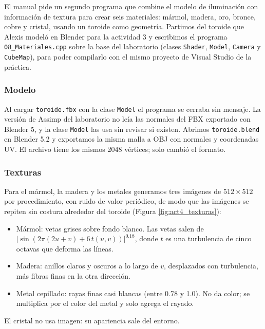 El manual pide un segundo programa que combine el modelo de iluminación con información de textura para crear seis materiales: mármol, madera, oro, bronce, cobre y cristal, usando un toroide como geometría. Partimos del toroide que Alexis modeló en Blender para la actividad 3 y escribimos el programa \texttt{08\_Materiales.cpp} sobre la base del laboratorio (clases \texttt{Shader}, \texttt{Model}, \texttt{Camera} y \texttt{CubeMap}), para poder compilarlo con el mismo proyecto de Visual Studio de la práctica.

\subsubsection{Modelo}

Al cargar \texttt{toroide.fbx} con la clase \texttt{Model} el programa se cerraba sin mensaje. La versión de Assimp del laboratorio no leía las normales del FBX exportado con Blender 5, y la clase \texttt{Model} las usa sin revisar si existen. Abrimos \texttt{toroide.blend} en Blender 5.2 y exportamos la misma malla a OBJ con normales y coordenadas UV. El archivo tiene los mismos 2048 vértices; solo cambió el formato.

\subsubsection{Texturas}

Para el mármol, la madera y los metales generamos tres imágenes de $512\times512$ por procedimiento, con ruido de valor periódico, de modo que las imágenes se repiten sin costura alrededor del toroide (Figura \ref{fig:act4_texturas}):

\begin{itemize}
    \item Mármol: vetas grises sobre fondo blanco. Las vetas salen de $|\sin(2\pi(2u+v) + 6\,t(u,v))|^{0.18}$, donde $t$ es una turbulencia de cinco octavas que deforma las líneas.
    \item Madera: anillos claros y oscuros a lo largo de $v$, desplazados con turbulencia, más fibras finas en la otra dirección.
    \item Metal cepillado: rayas finas casi blancas (entre 0.78 y 1.0). No da color; se multiplica por el color del metal y solo agrega el rayado.
\end{itemize}

El cristal no usa imagen: su apariencia sale del entorno.

